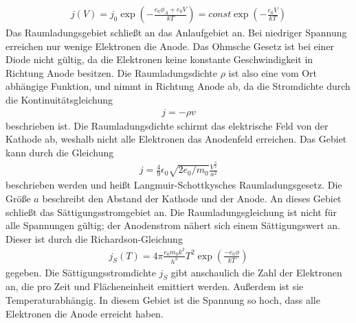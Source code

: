 \begin{align}
j(V) = j_0 \exp(-\frac{e_0 \phi_A + e_0 V}{k T}) = const \exp(-\frac{e_0 V}{k T})
\end{align}
Das Raumladungsgebiet schließt an das Anlaufgebiet an. Bei niedriger Spannung erreichen nur wenige Elektronen die Anode. Das Ohmsche Gesetz ist bei einer Diode nicht gültig, da die Elektronen keine konstante Geschwindigkeit in Richtung Anode besitzen. Die Raumladungsdichte $\rho$ ist also eine vom Ort abhängige Funktion, und nimmt in Richtung Anode ab, da die Stromdichte durch die Kontinuitätsgleichung
\begin{align}
j = -\rho v
\end{align}
beschrieben ist.
Die Raumladungsdichte schirmt das elektrische Feld von der Kathode ab, weshalb nicht alle Elektronen das Anodenfeld erreichen. Das Gebiet kann durch die Gleichung
\begin{align}
j = \frac{4}{9} \epsilon_0 \sqrt{2 e_0/m_0}\frac{V^\frac{3}{2}}{a^2}
\end{align}
beschrieben werden und heißt Langmuir-Schottkysches Raumladungsgesetz. Die Größe $a$ beschreibt den Abstand der Kathode und der Anode.
An dieses Gebiet schließt das Sättigungsstromgebiet an. Die Raumladungsgleichung ist nicht für alle Spannungen gültig; der Anodenstrom nähert sich einem Sättigungswert an. Dieser ist durch die Richardson-Gleichung
\begin{align}
j_S(T) = 4 \pi \frac{e_0 m_0 k^2}{h^3}T^2 \exp(\frac{-e_0 \phi}{k T})
\end{align}
gegeben. Die Sättigungsstromdichte $j_S$ gibt anschaulich die Zahl der Elektronen an, die pro Zeit und Flächeneinheit emittiert werden. Außerdem ist sie Temperaturabhängig. In diesem Gebiet ist die Spannung so hoch, dass alle Elektronen die Anode erreicht haben.

